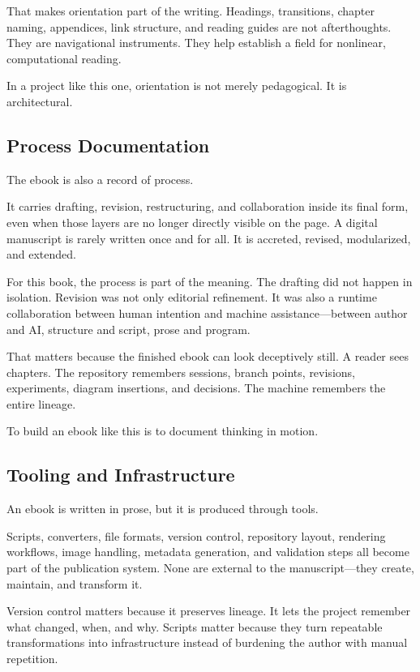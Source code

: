 \documentclass[
]{article}
\begin{document}
That makes orientation part of the writing. Headings, transitions,
chapter naming, appendices, link structure, and reading guides are not
afterthoughts. They are navigational instruments. They help establish a
field for nonlinear, computational reading.

In a project like this one, orientation is not merely pedagogical. It is
architectural.

\hypertarget{process-documentation}{%
\subsection{Process Documentation}\label{process-documentation}}

The ebook is also a record of process.

It carries drafting, revision, restructuring, and collaboration inside
its final form, even when those layers are no longer directly visible on
the page. A digital manuscript is rarely written once and for all. It is
accreted, revised, modularized, and extended.

For this book, the process is part of the meaning. The drafting did not
happen in isolation. Revision was not only editorial refinement. It was
also a runtime collaboration between human intention and machine
assistance---between author and AI, structure and script, prose and
program.

That matters because the finished ebook can look deceptively still. A
reader sees chapters. The repository remembers sessions, branch points,
revisions, experiments, diagram insertions, and decisions. The machine
remembers the entire lineage.

To build an ebook like this is to document thinking in motion.

\hypertarget{tooling-and-infrastructure}{%
\subsection{Tooling and
Infrastructure}\label{tooling-and-infrastructure}}

An ebook is written in prose, but it is produced through tools.

Scripts, converters, file formats, version control, repository layout,
rendering workflows, image handling, metadata generation, and validation
steps all become part of the publication system. None are external to
the manuscript---they create, maintain, and transform it.

Version control matters because it preserves lineage. It lets the
project remember what changed, when, and why. Scripts matter because
they turn repeatable transformations into infrastructure instead of
burdening the author with manual repetition.
\end{document}
